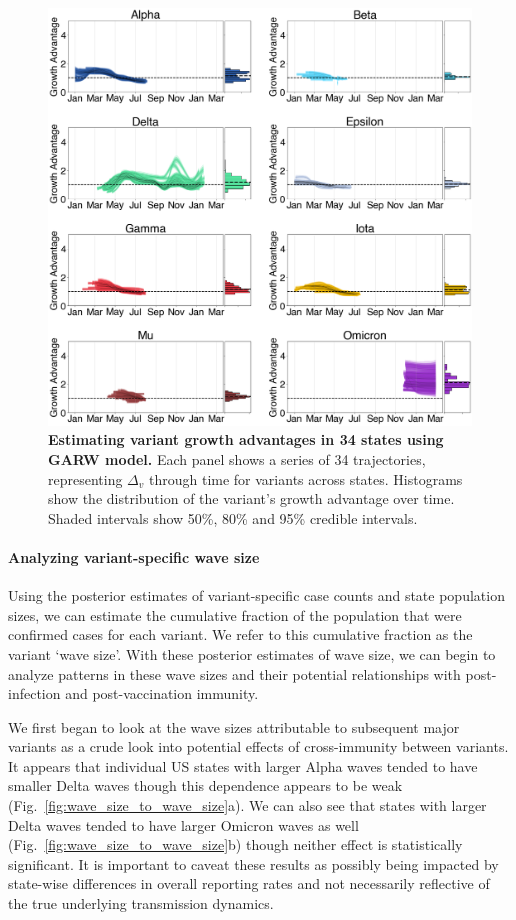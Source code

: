 \documentclass[11pt,oneside,letterpaper]{article}
\begin{document}
\begin{figure}[h!]
  \centering
  \includegraphics[width=\linewidth]{figs/ga_consensus.png}
  \caption{\textbf{Estimating variant growth advantages in 34 states using GARW model.}
  Each panel shows a series of 34 trajectories, representing $\Delta_{v}$ through time for variants across states.
  Histograms show the distribution of the variant's growth advantage over time.
  Shaded intervals show 50\%, 80\% and 95\% credible intervals.
  }
  \label{fig:ga_consensus}
\end{figure}

\paragraph{Analyzing variant-specific wave size}%

Using the posterior estimates of variant-specific case counts and state population sizes, we can estimate the cumulative fraction of the population that were confirmed cases for each variant.
We refer to this cumulative fraction as the variant `wave size'.
With these posterior estimates of wave size, we can begin to analyze patterns in these wave sizes and their potential relationships with post-infection and post-vaccination immunity.

We first began to look at the wave sizes attributable to subsequent major variants as a crude look into potential effects of cross-immunity between variants.
It appears that individual US states with larger Alpha waves tended to have smaller Delta waves though this dependence appears to be weak (Fig.\ \ref{fig:wave_size_to_wave_size}a).
We can also see that states with larger Delta waves tended to have larger Omicron waves as well (Fig.\ \ref{fig:wave_size_to_wave_size}b) though neither effect is statistically significant.
It is important to caveat these results as possibly being impacted by state-wise differences in overall reporting rates and not necessarily reflective of the true underlying transmission dynamics.
\end{document}
